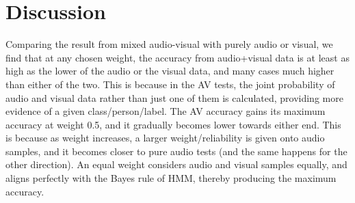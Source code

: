 \documentclass{article}
\begin{document}
\section{Discussion}
Comparing the result from mixed audio-visual with purely audio or visual, we find that at any chosen weight, the accuracy from audio+visual data is at least as high as the lower of the audio or the visual data, and many cases much higher than either of the two. This is because in the AV tests, the joint probability of audio and visual data rather than just one of them is calculated, providing more evidence of a given class/person/label.
The AV accuracy gains its maximum accuracy at weight 0.5, and it gradually becomes lower towards either end. This is because as weight increases, a larger weight/reliability is given onto audio samples, and it becomes closer to pure audio tests (and the same happens for the other direction). An equal weight considers audio and visual samples equally, and aligns perfectly with the Bayes rule of HMM, thereby producing the maximum accuracy.  
\end{document}
